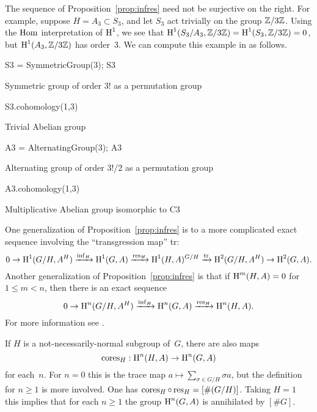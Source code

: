 \begin{example}
	The sequence of Proposition~\ref{prop:infres} need not be
	surjective on the right.  For example, suppose $H=A_3 \subset S_3$,
	and let $S_3$ act trivially on the group $\mathbb{Z}/3\mathbb{Z}$.
	Using the $\operatorname{Hom}$ interpretation of $\operatorname{H}^1$, we see
	that
	$\operatorname{H}^1(S_3/A_3, \mathbb{Z}/3\mathbb{Z}) = \operatorname{H}^1(S_3, \mathbb{Z}/3\mathbb{Z}) = 0$, but
	$\operatorname{H}^1(A_3, \mathbb{Z}/3\mathbb{Z})$ has order~$3$.
	We can compute this example in \sage as follows.
\begin{sagecode}
\begin{sagecell}
S3 = SymmetricGroup(3); S3
\end{sagecell}
\begin{sageout}
Symmetric group of order 3! as a permutation group
\end{sageout}
\begin{sagecell}
S3.cohomology(1,3)
\end{sagecell}
\begin{sageout}
Trivial Abelian group
\end{sageout}
\begin{sagecell}
A3 = AlternatingGroup(3); A3
\end{sagecell}
\begin{sageout}
Alternating group of order 3!/2 as a permutation group
\end{sageout}
\begin{sagecell}
A3.cohomology(1,3)
\end{sagecell}
\begin{sageout}
Multiplicative Abelian group isomorphic to C3
\end{sageout}
\end{sagecode}
\end{example}


\begin{remark}
	One generalization of Proposition~\ref{prop:infres} is to
	a more complicated exact sequence involving the ``transgression map''
	tr:
	$$
		0 \to \operatorname{H}^1(G/H, A^H)\xrightarrow{\operatorname{inf}_H} \operatorname{H}^1(G,A)\xrightarrow{\operatorname{res}_H} \operatorname{H}^1(H,A)^{G/H}
		\xrightarrow{{\rm tr}}  \operatorname{H}^2(G/H,A^H) \to \operatorname{H}^2(G,A).
	$$
	Another generalization of Proposition~\ref{prop:infres}
	is that if $\operatorname{H}^m(H,A) = 0$ for $1\leq m < n$, then
	there is an exact sequence
	$$
		0 \to \operatorname{H}^n(G/H, A^H)\xrightarrow{\operatorname{inf}_H}  \operatorname{H}^n(G,A)\xrightarrow{\operatorname{res}_H} \operatorname{H}^n(H,A).
	$$
	For more information see \cite[Ch.~VII.6]{serre:localfields}.
\end{remark}

\begin{remark}\label{rmk:cores}
	If $H$ is a not-necessarily-normal subgroup of~$G$, there are also
	maps
	$$
		\operatorname{cores}_H: \operatorname{H}^n(H,A) \to \operatorname{H}^n(G,A)
	$$
	for each~$n$.  For $n=0$ this is the trace map
	$a\mapsto \sum_{\sigma \in G/H} \sigma a$, but the
	definition for $n\geq 1$ is more involved. One has
	$\operatorname{cores}_H \circ \operatorname{res}_H = [\#(G/H)]$. Taking $H=1$ this
	implies that for each $n\geq 1$ the group
	$\operatorname{H}^n(G,A)$ is annihilated by $[\#G]$.
\end{remark}

